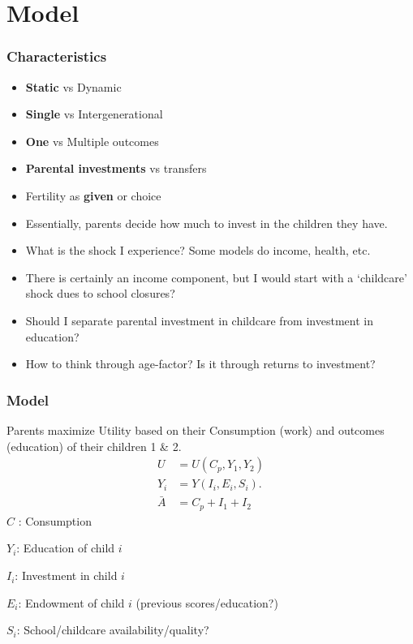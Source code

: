 \documentclass{beamer}
\begin{document}
\section{Model}

\begin{frame}
    \label{update_scott}
    \frametitle{Characteristics}
      \begin{itemize}
          \item \textbf{Static} vs Dynamic
          \item \textbf{Single} vs Intergenerational
          \item \textbf{One} vs Multiple outcomes
          \item \textbf{Parental investments} vs transfers
          \item Fertility as \textbf{given} or choice
          \item Essentially, parents decide how much to invest in the children they have.
          \item What is the shock I experience? Some models do income, health, etc. 
          \item There is certainly an income component, but I would start with a `childcare' shock dues to school closures?
          \item Should I separate parental investment in childcare from investment in education?
          \item How to think through age-factor? Is it through returns to investment?
      \end{itemize}
\end{frame}

\begin{frame}
    \label{update_scott}
    \frametitle{Model}
    Parents maximize Utility based on their Consumption (work) and outcomes (education) of their children 1 \& 2.
        \begin{equation}
        \begin{aligned}
        U &= U(C_p, Y_1, Y_2) \\
        Y_i &= Y(I_i, E_i, S_i). \\
        \bar{A} &= C_p + I_1 + I_2
        \end{aligned}
        \tag{1}
        \end{equation}
    $C$ : Consumption
    
    $Y_i$: Education of child $i$
    
    $I_i$: Investment in child $i$
    
    $E_i$: Endowment of child $i$ (previous scores/education?)

    $S_i$: School/childcare availability/quality?
\end{frame}
\end{document}

